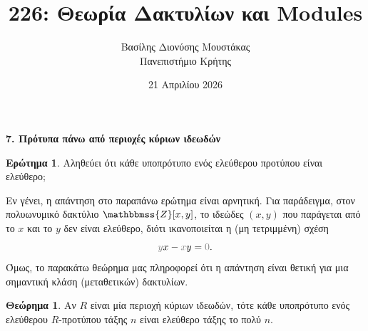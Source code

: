 \documentclass[12pt,a4paper,reqno]{amsart}
\title{226: Θεωρία Δακτυλίων και Modules}
\author[Β.~Δ. Μουστακας]{Βασίλης Διονύσης Μουστάκας \\ Πανεπιστήμιο Κρήτης}
\date{21 Απριλίου 2026}
\makeatletter
\theoremstyle{definition}
\newtheorem{theorem}{Θεώρημα}
\newtheorem*{que}{Ερώτημα}
\theoremstyle{remark}
\numberwithin{theorem}{section}
\numberwithin{exercise}{section}
\numberwithin{equation}{section}
\newcommand{\ZZ}{\mathbbmss{Z}}
\def\mathcolor#1#{\@mathcolor{#1}}
\def\@mathcolor#1#2#3{%
  \protect\leavevmode
  \begingroup
    \color#1{#2}#3%
  \endgroup
}
\makeatother
\begin{document}
\begingroup
\def\uppercasenonmath#1{} %
\let\MakeUppercase\relax %
\maketitle
\endgroup

\setcounter{section}{7}
\begin{center}
    \textbf{7. Πρότυπα πάνω από περιοχές κύριων ιδεωδών
} 
\end{center}

\begin{que}
Αληθεύει ότι κάθε υποπρότυπο ενός ελεύθερου προτύπου είναι ελεύθερο;
\end{que}

Εν γένει, η απάντηση στο παραπάνω ερώτημα είναι αρνητική. Για παράδειγμα, στον πολυωνυμικό δακτύλιο $\ZZ[x,y]$, το ιδεώδες $(x,y)$ που παράγεται από το $x$ και το $y$ δεν είναι ελεύθερο, διότι ικανοποιείται η (μη τετριμμένη) σχέση
\[
\mathcolor{gray}{y}x - \mathcolor{gray}{x}y = \mathcolor{gray}{0}.
\]
Όμως, το παρακάτω θεώρημα μας πληροφορεί ότι η απάντηση είναι θετική για μια σημαντική κλάση (μεταθετικών) δακτυλίων.
\begin{theorem}
    \label{thm:submodules_of_free_modules_are_free_over_PID}
    Αν $R$ είναι μία περιοχή κύριων ιδεωδών, τότε κάθε υποπρότυπο ενός ελεύθερου $R$-προτύπου τάξης $n$ είναι ελεύθερο τάξης το πολύ $n$.
\end{theorem}
\end{document}
